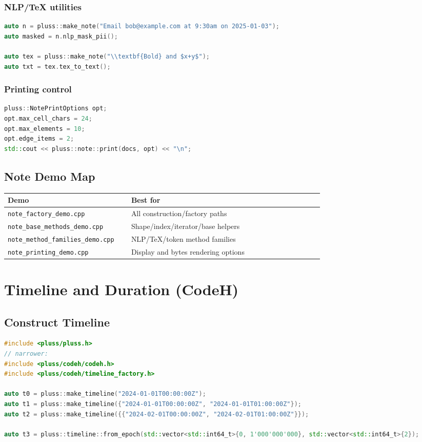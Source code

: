 \documentclass[11pt]{article}
\begin{document}
\subsubsection{NLP/TeX utilities}
\begin{lstlisting}[language=C++]
auto n = pluss::make_note("Email bob@example.com at 9:30am on 2025-01-03");
auto masked = n.nlp_mask_pii();

auto tex = pluss::make_note("\\textbf{Bold} and $x+y$");
auto txt = tex.tex_to_text();
\end{lstlisting}

\subsubsection{Printing control}
\begin{lstlisting}[language=C++]
pluss::NotePrintOptions opt;
opt.max_cell_chars = 24;
opt.max_elements = 10;
opt.edge_items = 2;
std::cout << pluss::note::print(docs, opt) << "\n";
\end{lstlisting}

\subsection{Note Demo Map}
\begin{longtable}{@{}p{0.36\linewidth}p{0.56\linewidth}@{}}
\textbf{Demo} & \textbf{Best for} \\
\hline
\texttt{note\_factory\_demo.cpp} & All construction/factory paths \\
\texttt{note\_base\_methods\_demo.cpp} & Shape/index/iterator/base helpers \\
\texttt{note\_method\_families\_demo.cpp} & NLP/TeX/token method families \\
\texttt{note\_printing\_demo.cpp} & Display and bytes rendering options \\
\end{longtable}

\section{Timeline and Duration (CodeH)}
\subsection{Construct Timeline}
\begin{lstlisting}[language=C++]
#include <pluss/pluss.h>
// narrower:
#include <pluss/codeh/codeh.h>
#include <pluss/codeh/timeline_factory.h>

auto t0 = pluss::make_timeline("2024-01-01T00:00:00Z");
auto t1 = pluss::make_timeline({"2024-01-01T00:00:00Z", "2024-01-01T01:00:00Z"});
auto t2 = pluss::make_timeline({{"2024-02-01T00:00:00Z", "2024-02-01T01:00:00Z"}});

auto t3 = pluss::timeline::from_epoch(std::vector<std::int64_t>{0, 1'000'000'000}, std::vector<std::int64_t>{2});
\end{lstlisting}
\end{document}
